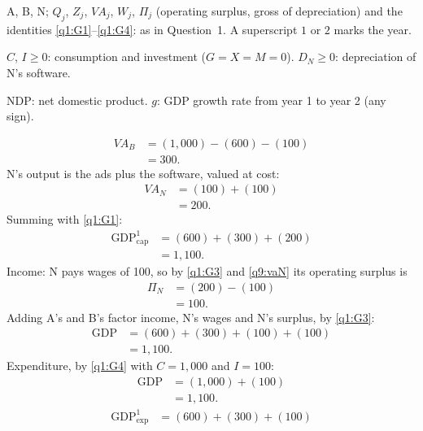 \begin{sol}
\begin{notacao}
\item A, B, N; $Q_j$, $Z_j$, $VA_j$, $W_j$, $\Pi_j$ (operating surplus, gross of depreciation) and the identities
\eqref{q1:G1}--\eqref{q1:G4}: as in Question~1. A superscript $1$ or $2$ marks the year.
\item $C$, $I\ge0$: consumption and investment ($G=X=M=0$). $D_N\ge0$: depreciation of N's software.
\item NDP: net domestic product. $g$: GDP growth rate from year 1 to year 2 (any sign).
\end{notacao}

\begin{align}
VA_B &= (1{,}000)-(600)-(100) \nonumber\\
&= 300. \label{q9:vaB}
\end{align}
N's output is the ads plus the software, valued at cost:
\begin{align}
VA_N &= (100)+(100) \nonumber\\
&= 200. \label{q9:vaN}
\end{align}
Summing with \eqref{q1:G1}:
\begin{align}
\text{GDP}^1_{\mathrm{cap}} &= (600)+(300)+(200) \nonumber\\
&= 1{,}100. \label{q9:Y1c}
\end{align}
Income: N pays wages of 100, so by \eqref{q1:G3} and \eqref{q9:vaN} its operating surplus is
\begin{align*}
\Pi_N &= (200)-(100)\\
&= 100 .
\end{align*}
Adding A's and B's factor income, N's wages and N's surplus, by \eqref{q1:G3}:
\begin{align*}
\text{GDP} &= (600)+(300)+(100)+(100)\\
&= 1{,}100 .
\end{align*}
Expenditure, by \eqref{q1:G4} with $C=1{,}000$ and $I=100$:
\begin{align*}
\text{GDP} &= (1{,}000)+(100)\\
&= 1{,}100 .
\end{align*}
\begin{align}
\text{GDP}^1_{\mathrm{exp}} &= (600)+(300)+(100) \nonumber\\

\end{align}
\end{sol}
